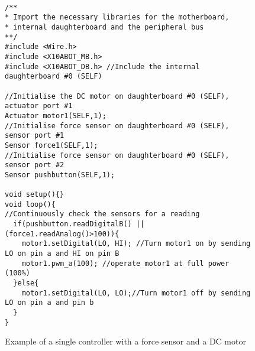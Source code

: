 \begin{figure}
		\footnotesize
    {\fontsize{8}{6}\selectfont
		\begin{verbatim}

/**
* Import the necessary libraries for the motherboard, 
* internal daughterboard and the peripheral bus
**/
#include <Wire.h>  
#include <X10ABOT_MB.h>
#include <X10ABOT_DB.h> //Include the internal daughterboard #0 (SELF)

//Initialise the DC motor on daughterboard #0 (SELF), actuator port #1
Actuator motor1(SELF,1);
//Initialise force sensor on daughterboard #0 (SELF), sensor port #1
Sensor force1(SELF,1);
//Initialise force sensor on daughterboard #0 (SELF), sensor port #2
Sensor pushbutton(SELF,1);

void setup(){}
void loop(){
//Continuously check the sensors for a reading
  if(pushbutton.readDigitalB() || (force1.readAnalog()>100)){
    motor1.setDigital(LO, HI); //Turn motor1 on by sending LO on pin a and HI on pin B
    motor1.pwm_a(100); //operate motor1 at full power (100%) 
  }else{
    motor1.setDigital(LO, LO);//Turn motor1 off by sending LO on pin a and pin b
  }
}	 
	\end{verbatim}
  }
  \caption{Example of a single controller with a force sensor and a DC motor} \label{code:simpl}
		
\end{figure}


